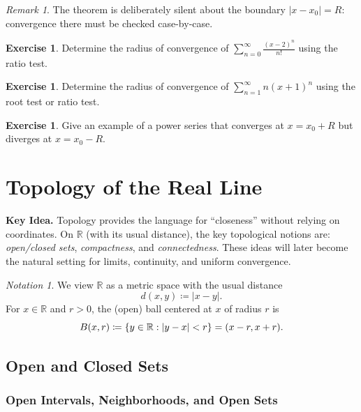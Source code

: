 \documentclass[12pt]{article}
\numberwithin{equation}{section}
\def\abs#1{|#1|}
\newcommand{\RR}{\mathbb{R}}
\DeclarePairedDelimiter{\abs}{\lvert}{\rvert}
\DeclarePairedDelimiter{\set}{\{}{\}}
\theoremstyle{plain}
\theoremstyle{definition}
\newtheorem{exercise}[theorem]{Exercise}
\theoremstyle{remark}
\newtheorem{remark}[theorem]{Remark}
\newtheorem{notation}[theorem]{Notation}
\newenvironment{keyidea}{\begin{tcolorbox}\textbf{Key Idea.}}{\end{tcolorbox}}
\begin{document}
\begin{remark}
The theorem is deliberately silent about the boundary $\abs{x-x_0}=R$: convergence there must be checked case-by-case.
\end{remark}

\begin{exercise}
Determine the radius of convergence of $\sum_{n=0}^{\infty}\frac{(x-2)^n}{n!}$ using the ratio test.
\end{exercise}

\begin{exercise}
Determine the radius of convergence of $\sum_{n=1}^{\infty} n(x+1)^n$ using the root test or ratio test.
\end{exercise}

\begin{exercise}
Give an example of a power series that converges at $x=x_0+R$ but diverges at $x=x_0-R$.
\end{exercise}

\newpage


\section{Topology of the Real Line}

\begin{keyidea}
Topology provides the language for ``closeness'' without relying on coordinates.
On $\RR$ (with its usual distance), the key topological notions are:
\emph{open/closed sets}, \emph{compactness}, and \emph{connectedness}.
These ideas will later become the natural setting for limits, continuity, and uniform convergence.
\end{keyidea}

\begin{notation}
We view $\RR$ as a metric space with the usual distance
\[
d(x,y)\coloneqq \abs{x-y}.
\]
For $x\in\RR$ and $r>0$, the (open) ball centered at $x$ of radius $r$ is
\[
B(x,r)\coloneqq \set{y\in\RR:\abs{y-x}<r}=(x-r,x+r).
\]
\end{notation}

\subsection{Open and Closed Sets}

\subsubsection{Open Intervals, Neighborhoods, and Open Sets}
\end{document}
